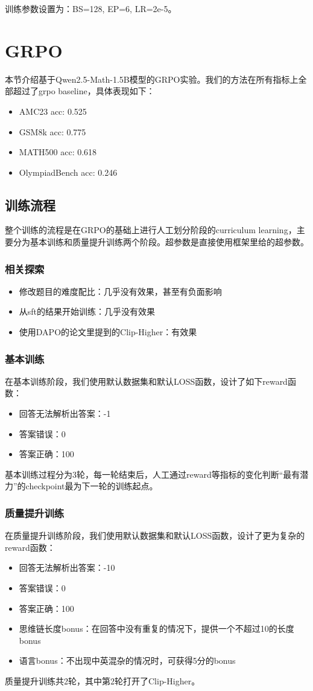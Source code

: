 \documentclass[12pt,hyperref,a4paper,UTF8]{ctexart}
\begin{document}
	训练参数设置为：BS=128, EP=6, LR=2e-5。
	
	\section{GRPO}
	本节介绍基于Qwen2.5-Math-1.5B模型的GRPO实验。我们的方法在所有指标上全部超过了grpo baseline，具体表现如下：
	\begin{itemize}
		\item AMC23 acc: 0.525
		\item GSM8k acc: 0.775
		\item MATH500 acc: 0.618
		\item OlympiadBench acc: 0.246
	\end{itemize}
	
	\subsection{训练流程}
	整个训练的流程是在GRPO的基础上进行人工划分阶段的curriculum learning，主要分为基本训练和质量提升训练两个阶段。超参数是直接使用框架里给的超参数。
	\subsubsection{相关探索}
	\begin{itemize}
		\item 修改题目的难度配比：几乎没有效果，甚至有负面影响
		\item 从sft的结果开始训练：几乎没有效果
		\item 使用DAPO的论文\cite{yu_DAPOOpenSourceLLM_2025}里提到的Clip-Higher：有效果
	\end{itemize}
	\subsubsection{基本训练}
	在基本训练阶段，我们使用默认数据集和默认LOSS函数，设计了如下reward函数：
	\begin{itemize}
		\item 回答无法解析出答案：-1
		\item 答案错误：0
		\item 答案正确：100
	\end{itemize}
	基本训练过程分为3轮，每一轮结束后，人工通过reward等指标的变化判断“最有潜力”的checkpoint最为下一轮的训练起点。
	
	\subsubsection{质量提升训练}
	在质量提升训练阶段，我们使用默认数据集和默认LOSS函数，设计了更为复杂的reward函数：
	\begin{itemize}
		\item 回答无法解析出答案：-10
		\item 答案错误：0
		\item 答案正确：100
		\item 思维链长度bonus：在回答中没有重复的情况下，提供一个不超过10的长度bonus
		\item 语言bonus：不出现中英混杂的情况时，可获得5分的bonus
	\end{itemize}
	质量提升训练共2轮，其中第2轮打开了Clip-Higher。
	
\end{document}
